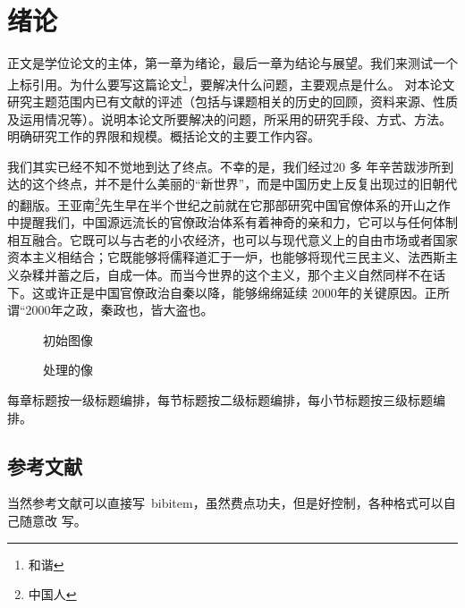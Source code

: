 \section{绪论}
正文是学位论文的主体，第一章为绪论，最后一章为结论与展望。我们来测试一个上标引用。为什么要写这篇论文\footnote{和谐}，要解决什么问题，主要观点是什么。 对本论文研究主题范围内已有文献的评述（包括与课题相关的历史的回顾，资料来源、性质及运用情况等）。说明本论文所要解决的问题，所采用的研究手段、方式、方法。明确研究工作的界限和规模。概括论文的主要工作内容。

我们其实已经不知不觉地到达了终点。不幸的是，我们经过20 多
年辛苦跋涉所到达的这个终点，并不是什么美丽的“新世界”，而是中国历史上反复出现过的旧朝代的翻版。王亚南\footnote{中国人}先生早在半个世纪之前就在它那部研究中国官僚体系的开山之作中提醒我们，中国源远流长的官僚政治体系有着神奇的亲和力，它可以与任何体制相互融合。它既可以与古老的小农经济，也可以与现代意义上的自由市场或者国家资本主义相结合；它既能够将儒释道汇于一炉，也能够将现代三民主义、法西斯主义杂糅并蓄之后，自成一体。而当今世界的这个主义，那个主义自然同样不在话下。这或许正是中国官僚政治自秦以降，能够绵绵延续
2000年的关键原因。正所谓“2000年之政，秦政也，皆大盗也。
\begin{figure}[H]
\centering
\subfigure[原始图像]{\label{figure:001} \texttt{[image: 001]}}
\subfigure[噪声图像（$\mu=0,\sigma=20$)]{\label{figure:002} \texttt{[image: 002]}}
\caption{初始图像}
\end{figure}

\begin{figure}[H]
\centering
\subfigure[$\lambda=\frac{1}{20^2}$]{\label{figure:1/20}
 \texttt{[image: 003]}}
\subfigure[$\lambda=\frac{5}{20^2}$]{\label{figure:5/20} \texttt{[image: 004]}}
\subfigure[$\lambda=\frac{10}{20^2}$]{\label{figure:10/20} \texttt{[image: 005]}}
\subfigure[$\lambda=\frac{20}{20^2}$]{\label{figure:20/20} \texttt{[image: 006]}}
\caption{处理的像}
\end{figure}   

    每章标题按一级标题编排，每节标题按二级标题编排，每小节标题按三级标题编排。
    
\subsection{参考文献}
\label{sec:bib}
当然参考文献可以直接写~bibitem，虽然费点功夫，但是好控制，各种格式可以自己随意改
写。

